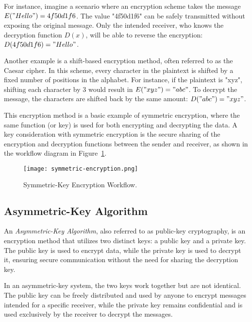 \documentclass[12pt,a4paper]{report}
\begin{document}
For instance, imagine a scenario where an encryption scheme takes the message \( E("Hello") = 4f50d1f6 \). The value "4f50d1f6" can be safely transmitted without exposing the original message. Only the intended receiver, who knows the decryption function \( D(x) \), will be able to reverse the encryption: \( D(4f50d1f6) = "Hello" \).

Another example is a shift-based encryption method, often referred to as the Caesar cipher. In this scheme, every character in the plaintext is shifted by a fixed number of positions in the alphabet. For instance, if the plaintext is "xyz", shifting each character by 3 would result in \( E("xyz") = "abc" \). To decrypt the message, the characters are shifted back by the same amount: \( D("abc") = "xyz" \).

This encryption method is a basic example of symmetric encryption, where the same function (or key) is used for both encrypting and decrypting the data. A key consideration with symmetric encryption is the secure sharing of the encryption and decryption functions between the sender and receiver, as shown in the workflow diagram in Figure~\ref{fig:symmetric-encryption}.

\begin{figure}[ht]
    \centering
    \texttt{[image: symmetric-encryption.png]}
    \caption{Symmetric-Key Encryption Workflow.}
    \label{fig:symmetric-encryption}
\end{figure}



\subsection{Asymmetric-Key Algorithm}

\begin{tcolorbox}[colframe=black!75, colback=white, sharp corners, fonttitle=\bfseries, boxrule=0.5pt, title=\faInfoCircle\ Definition 1-8]
An \textit{Asymmetric-Key Algorithm}, also referred to as public-key cryptography, is an encryption method that utilizes two distinct keys: a public key and a private key. The public key is used to encrypt data, while the private key is used to decrypt it, ensuring secure communication without the need for sharing the decryption key.
\end{tcolorbox}

In an asymmetric-key system, the two keys work together but are not identical. The public key can be freely distributed and used by anyone to encrypt messages intended for a specific receiver, while the private key remains confidential and is used exclusively by the receiver to decrypt the messages.
\end{document}
